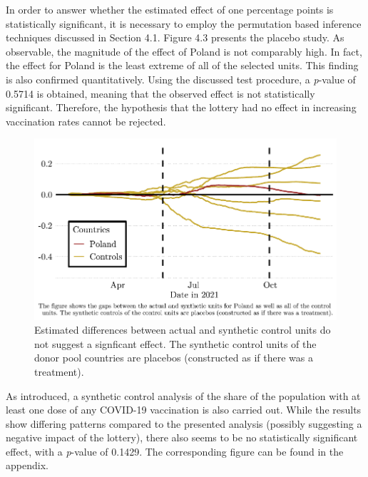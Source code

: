 \documentclass{scrbook}
\begin{document}
In order to answer whether the estimated effect of one percentage points
is statistically significant, it is necessary to employ the permutation
based inference techniques discussed in Section 4.1. Figure 4.3 presents
the placebo study. As observable, the magnitude of the effect of Poland
is not comparably high. In fact, the effect for Poland is the least
extreme of all of the selected units. This finding is also confirmed
quantitatively. Using the discussed test procedure, a \textit{p}-value
of 0.5714 is obtained, meaning that the observed effect is not
statistically significant. Therefore, the hypothesis that the lottery
had no effect in increasing vaccination rates cannot be rejected.

\begin{figure}[h]
\caption[Placebo plot of Poland and donor pool]{Estimated differences between actual and synthetic control units do not suggest a signficant effect. The synthetic control units of the donor pool countries are placebos (constructed as if there was a treatment).}

\begin{center}\includegraphics{bachelor_thesis_files/figure-latex/unnamed-chunk-4-1} \end{center}
\end{figure}

As introduced, a synthetic control analysis of the share of the
population with at least one dose of any COVID-19 vaccination is also
carried out. While the results show differing patterns compared to the
presented analysis (possibly suggesting a negative impact of the
lottery), there also seems to be no statistically significant effect,
with a \textit{p}-value of 0.1429. The corresponding figure can be found
in the appendix.
\end{document}
